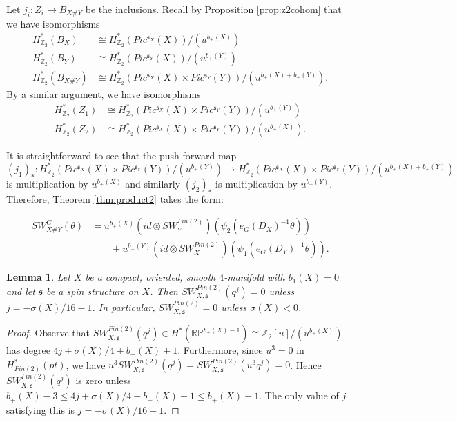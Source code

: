 \documentclass{amsart}
\newtheorem{lemma}[theorem]{Lemma}
\theoremstyle{definition}
\theoremstyle{remark}
\numberwithin{equation}{section}
\begin{document}
Let $j_i : Z_i \to B_{X \# Y}$ be the inclusions. Recall by Proposition \ref{prop:z2cohom} that we have isomorphisms 
\begin{align*}
H^*_{\mathbb{Z}_2}(B_{X}) &\cong H^*_{\mathbb{Z}_2}( Pic^{\mathfrak{s}_X}(X))/( u^{b_+(X)}) \\
H^*_{\mathbb{Z}_2}(B_{Y}) &\cong H^*_{\mathbb{Z}_2}( Pic^{\mathfrak{s}_Y}(X))/( u^{b_+(Y)}) \\
H^*_{\mathbb{Z}_2}(B_{X \# Y}) &\cong H^*_{\mathbb{Z}_2}( Pic^{\mathfrak{s}_X}(X) \times Pic^{\mathfrak{s}_Y}(Y))/( u^{b_+(X)+b_+(Y)}).
\end{align*}
By a similar argument, we have isomorphisms
\begin{align*}
H^*_{\mathbb{Z}_2}(Z_1) &\cong H^*_{\mathbb{Z}_2}( Pic^{\mathfrak{s}_X}(X) \times Pic^{\mathfrak{s}_Y}(Y) )/( u^{b_+(Y)}) \\
H^*_{\mathbb{Z}_2}(Z_2) &\cong H^*_{\mathbb{Z}_2}( Pic^{\mathfrak{s}_X}(X) \times Pic^{\mathfrak{s}_Y}(Y) )/( u^{b_+(X)}).
\end{align*}

It is straightforward to see that the push-forward map
\[
(j_1)_* : H^*_{\mathbb{Z}_2}( Pic^{\mathfrak{s}_X}(X) \times Pic^{\mathfrak{s}_Y}(Y) )/( u^{b_+(Y)})  \to H^*_{\mathbb{Z}_2}( Pic^{\mathfrak{s}_X}(X) \times Pic^{\mathfrak{s}_Y}(Y) )/( u^{b_+(X)+b_+(Y)}) 
\]
is multiplication by $u^{b_+(X)}$ and similarly $(j_2)_*$ is multiplication by $u^{b_+(Y)}$. Therefore, Theorem \ref{thm:product2} takes the form:

\begin{align*}
SW^{G}_{X \# Y}(\theta) &=  u^{b_+(X)} \left( id \otimes SW^{Pin(2)}_Y \right)( \psi_2(e_{G}(D_X)^{-1}\theta) ) \\
& \quad \quad + u^{b_+(Y)} \left(id \otimes SW^{Pin(2)}_X \right)( \psi_1( e_{G}(D_Y)^{-1} \theta) ).
\end{align*}



\begin{lemma}\label{lem:j}
Let $X$ be a compact, oriented, smooth $4$-manifold with $b_1(X) = 0$ and let $\mathfrak{s}$ be a spin structure on $X$. Then $SW^{Pin(2)}_{X,\mathfrak{s}}(q^j) = 0$ unless $j = -\sigma(X)/16 - 1$. In particular, $SW^{Pin(2)}_{X,\mathfrak{s}} = 0$ unless $\sigma(X) < 0$.
\end{lemma}
\begin{proof}
Observe that $SW^{Pin(2)}_{X,\mathfrak{s}}(q^j ) \in H^*( \mathbb{RP}^{b_+(X)-1} ) \cong \mathbb{Z}_2[u]/(u^{b_+(X)})$ has degree $4j + \sigma(X)/4 + b_+(X)+1$. Furthermore, since $u^3 = 0$ in $H^*_{Pin(2)}(pt)$, we have $u^3 SW^{Pin(2)}_{X,\mathfrak{s}}(q^j) = SW^{Pin(2)}_{X,\mathfrak{s}}(u^3 q^j) = 0$. Hence $SW^{Pin(2)}_{X,\mathfrak{s}}(q^j)$ is zero unless $b_+(X)-3 \le 4j+\sigma(X)/4 + b_+(X)+1 \le b_+(X)-1$. The only value of $j$ satisfying this is $j=-\sigma(X)/16-1$.
\end{proof}
\end{document}
